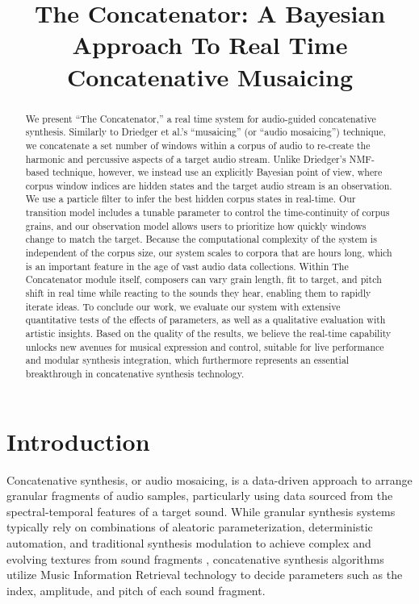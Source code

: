 \documentclass{article}
\title{The Concatenator: A Bayesian Approach To Real Time Concatenative Musaicing}
\begin{document}
%
\maketitle
%

\begin{abstract}
    We present ``The Concatenator,'' a real time system for audio-guided concatenative synthesis. Similarly to Driedger et al.'s ``musaicing'' (or ``audio mosaicing'') technique, we concatenate a set number of windows within a corpus of audio to re-create the harmonic and percussive aspects of a target audio stream. Unlike Driedger's NMF-based technique, however, we instead use an explicitly Bayesian point of view, where corpus window indices are hidden states and the target audio stream is an observation. We use a particle filter to infer the best hidden corpus states in real-time. Our transition model includes a tunable parameter to control the time-continuity of corpus grains, and our observation model allows users to prioritize how quickly windows change to match the target. Because the computational complexity of the system is independent of the corpus size, our system scales to corpora that are hours long, which is an important feature in the age of vast audio data collections. Within The Concatenator module itself, composers can vary grain length, fit to target, and pitch shift in real time while reacting to the sounds they hear, enabling them to rapidly iterate ideas. To conclude our work, we evaluate our system with extensive quantitative tests of the effects of parameters, as well as a qualitative evaluation with artistic insights. Based on the quality of the results, we believe the real-time capability unlocks new avenues for musical expression and control, suitable for live performance and modular synthesis integration, which furthermore represents an essential breakthrough in concatenative synthesis technology.
    
\end{abstract}

\section{Introduction}

Concatenative synthesis, or audio mosaicing, is a data-driven approach to arrange granular fragments of audio samples, particularly using data sourced from the spectral-temporal features of a target sound. While granular synthesis systems typically rely on combinations of aleatoric parameterization, deterministic automation, and traditional synthesis modulation to achieve complex and evolving textures from sound fragments \cite{roads1978granular}, concatenative synthesis algorithms utilize Music Information Retrieval technology to decide parameters such as the index, amplitude, and pitch of each sound fragment. 
\end{document}
